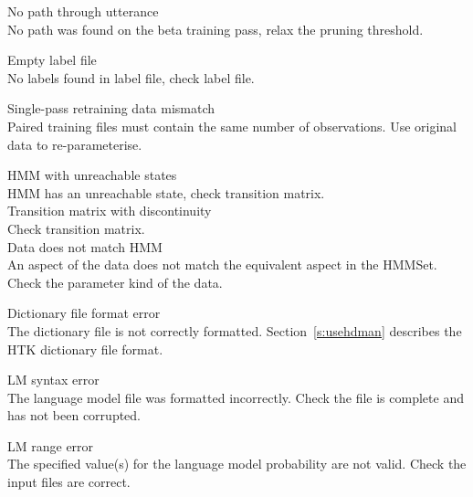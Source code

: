 \begin{itemize}
\begin{itemize}
    No path through utterance\\
        No path was found on the beta training pass, relax the
        pruning threshold.

    Empty label file\\
        No labels found in label file, check label file.

    Single-pass retraining data mismatch\\
        Paired training files must contain the same number of observations.  
        Use original data to re-parameterise.

  HMM with unreachable states\\
        HMM has an unreachable state, check transition matrix.\\

 Transition matrix with discontinuity\\
        Check transition matrix.\\        

    Data does not match HMM\\
        An aspect of the data does not match the equivalent aspect in 
        the HMMSet.  Check the parameter kind of the data.

\end{itemize}


\begin{itemize}
    Dictionary file format error\\
        The dictionary file is not correctly formatted.  
        Section~\ref{s:usehdman} describes the HTK dictionary file format.

\end{itemize}


\begin{itemize}
    LM syntax error\\
        The language model file was formatted incorrectly.  Check the file is
        complete and has not been corrupted.

 LM range error\\
        The specified value(s) for the language model probability are not 
        valid.  Check the input files are correct.

\end{itemize}


\end{itemize}
